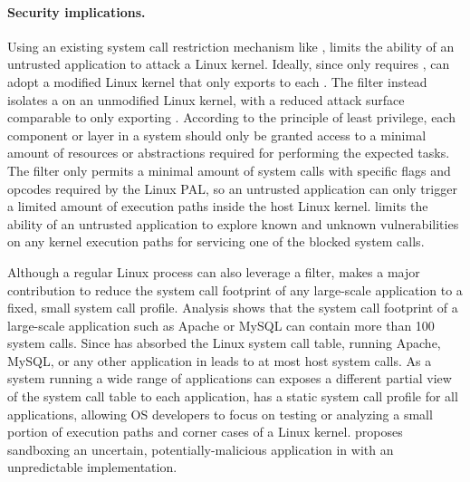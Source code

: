 

\paragraph{Security implications.}
Using an existing system call restriction mechanism like \seccomp{},
\graphene{} limits the ability of an untrusted application to attack a Linux kernel.
Ideally, since \thelibos{} only requires \thehostabi{},
\graphene{} can adopt a modified Linux kernel
that only exports \palcallnum{} \hostapis{} to each \picoproc{}.
The \seccomp{} filter instead isolates a \picoproc{} on an unmodified Linux kernel,
with a reduced attack surface 
comparable to only exporting \thehostabi{}.
According to the principle of least privilege,
each component or layer in a system should only be granted access to a minimal amount of resources or abstractions
required for performing the expected tasks.
The \seccomp{} filter only permits
a minimal amount of system calls with specific flags and opcodes
required by the Linux PAL,
so an untrusted application
can only trigger
a limited amount of execution paths inside the host Linux kernel.
\graphene{} limits
the ability of an untrusted application to explore
known and unknown vulnerabilities
on any kernel execution paths for servicing one of the blocked system calls.



Although a regular Linux process can also leverage a \seccomp{} filter,
\graphene{} makes a major contribution
to reduce the system call footprint of any large-scale application
to a fixed, small system call profile.
Analysis %
shows that the system call  footprint of a large-scale application such as Apache or MySQL can contain more than 100 system calls.
Since \thelibos{} has absorbed the Linux system call table,
running Apache, MySQL, or any other application in \graphene{} leads to at most \hostsyscallnum{} host system calls.
As a system
running a wide range of applications
can exposes a different partial view of the system call table to each application,
\graphene{}
has a static system call profile for all applications,
allowing OS developers to focus
on testing or analyzing a small portion of execution paths and corner cases
of a Linux kernel.
\citet{sun15unpredictability}
proposes sandboxing an uncertain, potentially-malicious application
in \graphene{}
with an unpredictable \thelibos{} implementation.







